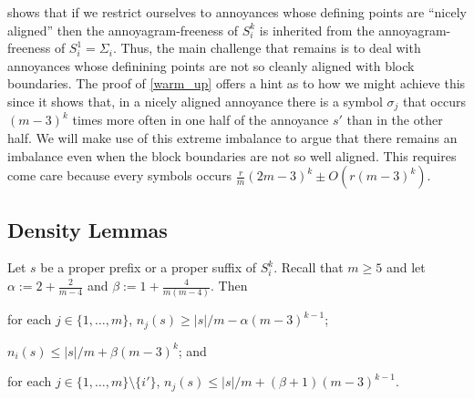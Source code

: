 \documentclass[kpfonts]{patmorin}
\begin{document}
 shows that if we restrict ourselves to annoyances whose defining points are ``nicely aligned'' then the annoyagram-freeness of $S_i^k$ is inherited from the annoyagram-freeness of $S_i^1=\Sigma_i$.  Thus, the main challenge that remains is to deal with annoyances whose definining points are not so cleanly aligned with block boundaries.  The proof of \cref{warm_up} offers a hint as to how we might achieve this since it shows that, in a nicely aligned annoyance there is a symbol $\sigma_j$ that occurs $(m-3)^k$ times more often in one half of the annoyance $s'$ than in the other half.  We will make use of this extreme imbalance to argue that there remains an imbalance even when the block boundaries are not so well aligned.  This requires come care because every symbols occurs $\tfrac{r}{m}(2m-3)^k\pm O(r(m-3)^k)$.

\subsection{Density Lemmas}

\begin{clm}\label{prefix_bounds}
    Let $s$ be a proper prefix or a proper suffix of $S_i^k$.  Recall that $m\ge 5$ and let $\alpha:= 2+\tfrac{2}{m-4}$ and $\beta := 1+\tfrac{4}{m(m-4)}$.  Then
    \begin{compactenum}[(i)]
        \item for each $j\in\{1,\ldots,m\}$, $n_j(s)\ge |s|/m - \alpha(m-3)^{k-1}$;
        \item $n_{i}(s) \le |s|/m+\beta(m-3)^k$; and
        \item for each $j\in\{1,\ldots,m\}\setminus\{i'\}$, $n_j(s) \le |s|/m+ (\beta+1)(m-3)^{k-1}$.
    \end{compactenum}
\end{clm}
\end{document}
